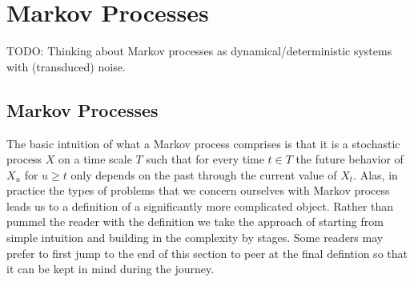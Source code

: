 \section{Markov Processes}

TODO: Thinking about Markov processes as dynamical/deterministic
systems with (transduced) noise.

\subsection{Markov Processes}
The basic intuition of what a Markov process comprises is that it is a
stochastic process $X$ on a time scale $T$ such that for every time $t \in
T$ the future behavior of $X_u$ for $u \geq t$ only depends on the
past through the current value of $X_t$.  Alas, in practice the types
of problems that we concern ourselves with Markov process leads us to
a definition of a significantly more complicated object.  Rather than
pummel the reader with the definition we take the approach of starting
from simple intuition and building in the complexity by stages.  Some
readers may prefer to first jump to the end of this section to peer at
the final defintion so that it can be kept in mind during the journey.

